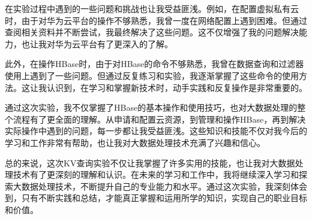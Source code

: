 \documentclass[12pt,hyperref,a4paper,UTF8]{ctexart}
\begin{document}
在实验过程中遇到的一些问题和挑战也让我受益匪浅。例如，在配置虚拟私有云时，由于对华为云平台的操作不够熟悉，我曾一度在网络配置上遇到困难。但通过查阅相关资料并不断尝试，我最终解决了这些问题。这不仅增强了我的问题解决能力，也让我对华为云平台有了更深入的了解。

此外，在操作HBase时，由于对HBase的命令不够熟悉，我曾在数据查询和过滤器使用上遇到了一些问题。但通过反复练习和实验，我逐渐掌握了这些命令的使用方法。这让我认识到，在学习和掌握新技术时，动手实践和反复操作是非常重要的。

通过这次实验，我不仅掌握了HBase的基本操作和使用技巧，也对大数据处理的整个流程有了更全面的理解。从申请和配置云资源，到管理和操作HBase，再到解决实际操作中遇到的问题，每一步都让我受益匪浅。这些知识和技能不仅对我今后的学习和工作非常有帮助，也让我对大数据处理技术充满了兴趣和信心。

总的来说，这次KV查询实验不仅让我掌握了许多实用的技能，也让我对大数据处理技术有了更深刻的理解和认识。在未来的学习和工作中，我将继续深入学习和探索大数据处理技术，不断提升自己的专业能力和水平。通过这次实验，我深刻体会到，只有不断实践和总结，才能真正掌握和运用所学的知识，实现自己的职业目标和价值。






\end{document}

